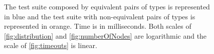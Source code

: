   
\begin{figure}[t]
  
\caption{The test suite composed by equivalent pairs of types is represented in blue and the
  test suite with non-equivalent pairs of types is represented in orange. Time is in
  milliseconds. Both scales of \ref{fig:distribution} and \ref{fig:numberOfNodes} are logarithmic and
  the scale of \ref{fig:timeouts} is linear.}
\label{fig:results}
\end{figure}

